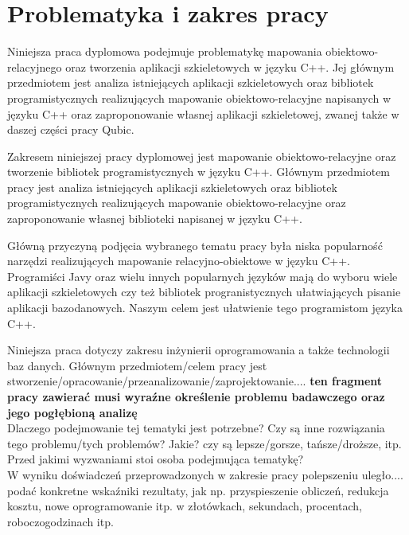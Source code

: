 \documentclass[12pt]{report}
\begin{document}
\section{Problematyka i zakres pracy}





Niniejsza praca dyplomowa podejmuje problematykę mapowania obiektowo-relacyjnego oraz tworzenia aplikacji szkieletowych w języku C++. Jej głównym przedmiotem jest analiza
istniejących aplikacji szkieletowych oraz bibliotek programistycznych realizujących mapowanie obiektowo-relacyjne napisanych w języku C++ oraz zaproponowanie własnej aplikacji szkieletowej, zwanej także w daszej części pracy Qubic. 

Zakresem niniejszej pracy dyplomowej jest mapowanie obiektowo-relacyjne oraz tworzenie bibliotek programistycznych w języku C++. Głównym przedmiotem pracy jest
analiza istniejących aplikacji szkieletowych oraz bibliotek programistycznych realizujących mapowanie obiektowo-relacyjne oraz zaproponowanie własnej biblioteki napisanej 
w języku C++.

\indent Główną przyczyną podjęcia wybranego tematu pracy była niska popularność narzędzi realizujących mapowanie relacyjno-obiektowe w języku C++. Programiści Javy
oraz wielu innych popularnych języków mają do wyboru wiele aplikacji szkieletowych czy też bibliotek progranistycznych ułatwiających pisanie aplikacji bazodanowych. Naszym
celem jest ułatwienie tego programistom języka C++.


Niniejsza praca dotyczy zakresu inżynierii oprogramowania a także technologii baz danych.
\indent Głównym przedmiotem/celem pracy jest
stworzenie/opracowanie/przeanalizo\-wanie/zaprojektowanie.... {\bf ten fragment
pracy zawierać musi wyraźne określenie problemu badawczego oraz jego pogłębioną
analizę}\\

\indent Dlaczego podejmowanie tej tematyki jest potrzebne? Czy są inne rozwiązania tego problemu/tych problemów? Jakie? czy są lepsze/gorsze, tańsze/droższe, itp.
\indent Przed jakimi wyzwaniami stoi osoba podejmująca tematykę? \\
 W wyniku doświadczeń przeprowadzonych w zakresie pracy polepszeniu
uległo.... podać konkretne wskaźniki rezultaty, jak np. przyspieszenie obliczeń,
redukcja kosztu, nowe oprogramowanie itp. w złotówkach, sekundach, procentach, roboczogodzinach itp. 
\end{document}
